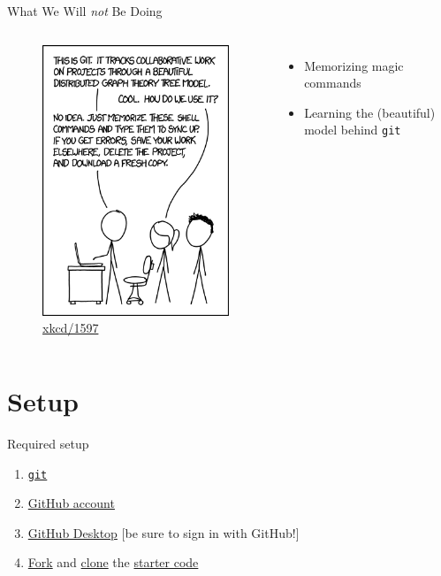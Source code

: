 \documentclass{beamer}
\theoremstyle{example}
\newcommand{\xkcd}[1]{\href{https://xkcd.com/#1}{xkcd/#1}}
\begin{document}
\begin{frame}{What We Will \emph{not} Be Doing}
    \begin{columns}
        \begin{figure}
            \includegraphics[scale=0.4]{img/git}
            \caption{\xkcd{1597}}
        \end{figure}

        \begin{itemize}
            \item Memorizing magic commands
            \item Learning the (beautiful) model behind \texttt{git}
        \end{itemize}
    \end{columns}
\end{frame}

\section{Setup}
\begin{frame}{Required setup}
    \begin{enumerate}[<+->]
        \item
            \href{https://git-scm.com/book/en/v2/Getting-Started-Installing-Git}
            {\texttt{git}}
        \item
            \href{https://github.com}
            {GitHub account}
        \item \href{https://desktop.github.com}
            {GitHub Desktop} [be sure to sign in with GitHub!]
        \item \href{https://github.com/benknoble/git-wizard-code/fork}{Fork}
            and
            \href{https://help.github.com/en/desktop/contributing-to-projects/cloning-a-repository-from-github-desktop}{clone}
            the
            \href{https://github.com/benknoble/git-wizard-code}{starter code}
    \end{enumerate}
\end{frame}
\end{document}
